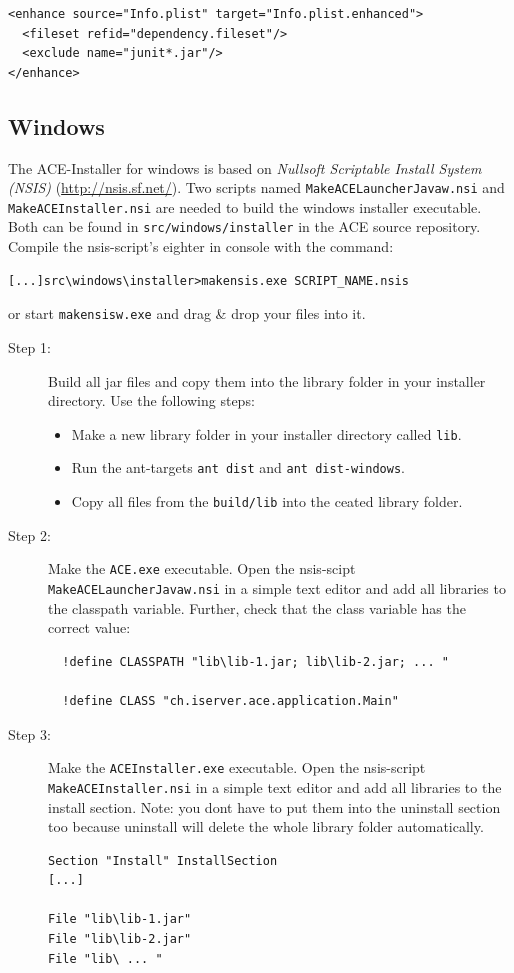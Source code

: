 \documentclass[11pt,a4paper]{article}
\begin{document}
\small{
\begin{verbatim}
<enhance source="Info.plist" target="Info.plist.enhanced">
  <fileset refid="dependency.fileset"/>
  <exclude name="junit*.jar"/>
</enhance>
\end{verbatim}
}

\subsection{Windows}
The ACE-Installer for windows is based on \textit{Nullsoft Scriptable Install System (NSIS)} (\href{http://nsis.sf.net/}{http://nsis.sf.net/}). Two scripts named \texttt{MakeACELauncherJavaw.nsi} and \texttt{MakeACEInstaller.nsi} are needed to build the windows installer executable. Both can be found in \texttt{src/windows/installer} in the ACE source repository. \\

Compile the nsis-script's eighter in console with the command:
\begin{verbatim}
[...]src\windows\installer>makensis.exe SCRIPT_NAME.nsis
\end{verbatim}
or start \texttt{makensisw.exe} and drag \& drop your files into it. \\

\begin{description}
\item[Step 1:] Build all jar files and copy them into the library folder in your installer directory. Use the following steps:
  \begin{itemize}
  \item Make a new library folder in your installer directory called \texttt{lib}.
  \item Run the ant-targets \texttt{ant dist} and \texttt{ant dist-windows}.
  \item Copy all files from the \texttt{build/lib} into the ceated library folder.
  \end{itemize}

\item[Step 2:] Make the \texttt{ACE.exe} executable. Open the nsis-scipt \texttt{MakeACELauncherJavaw.nsi} in a simple text editor and add all libraries to the classpath variable. Further, check that the class variable has the correct value:
\begin{verbatim}
  !define CLASSPATH "lib\lib-1.jar; lib\lib-2.jar; ... "
  
  !define CLASS "ch.iserver.ace.application.Main"
\end{verbatim}

\item[Step 3:] Make the \texttt{ACEInstaller.exe} executable. Open the nsis-script \texttt{MakeACEInstaller.nsi} in a simple text editor and add all libraries to the install section. Note: you dont have to put them into the uninstall section too because uninstall will delete the whole library folder automatically.
\begin{verbatim}
Section "Install" InstallSection
[...]

File "lib\lib-1.jar"
File "lib\lib-2.jar"
File "lib\ ... "
\end{verbatim}

\end{description}
\end{document}
